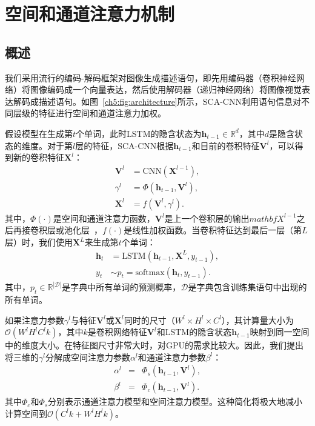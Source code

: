 \section{空间和通道注意力机制}

\subsection{概述}
我们采用流行的编码-解码框架对图像生成描述语句，即先用编码器（卷积神经网络）将图像编码成一个向量表达，然后使用解码器（递归神经网络）将图像视觉表达解码成描述语句。如图~\ref{ch5:fig:architecture}所示，SCA-CNN利用语句信息对不同层级的特征进行空间和通道注意力加权。

假设模型在生成第$t$个单词，此时LSTM的隐含状态为$\mathbf{h}_{t-1}\in\mathbb{R}^d$，其中$d$是隐含状态的维度。对于第$l$层的特征，SCA-CNN根据$\mathbf{h}_{t-1}$和目前的卷积特征$\mathbf{V}^l$，可以得到新的卷积特征$\mathbf{X}^l$：
\begin{equation} \label{ch5:eq:eq_1}
\begin{split}
\mathbf{V}^l &= \textrm{CNN}\left(\mathbf{X}^{l-1}\right),\\
\gamma^l &= \Phi\left(\mathbf{h}_{t-1},\mathbf{V}^l\right),\\
\mathbf{X}^l &= f\left(\mathbf{V}^{l},\gamma^{l}\right).
\end{split}
\end{equation}
其中，$\Phi(\cdot)$是空间和通道注意力函数，$\mathbf{V}^l$是上一个卷积层的输出$mathbf{X}^{l-1}$之后再接卷积层或池化层~\cite{simonyan2015very,he2016deep}，$f(\cdot)$是线性加权函数。当卷积特征达到最后一层（第$L$层）时，我们使用$\mathbf{X}^L$来生成第$t$个单词：
\begin{equation}
\begin{split}
\mathbf{h}_t &= \textrm{LSTM}\left(\mathbf{h}_{t-1},\mathbf{X}^L,y_{t-1}\right),\\
y_t & \sim p_t = \textrm{softmax} \left(\mathbf{h}_t, y_{t-1} \right).
\end{split}
\end{equation}
其中，$p_t \in \mathbb{R}^{|\mathcal{D}|}$是字典中所有单词的预测概率，$\mathcal{D}$是字典包含训练集语句中出现的所有单词。

如果注意力参数$\gamma^l$与特征$\mathbf{V}^l$或$\mathbf{X}^l$同时的尺寸（$W^l\times H^l\times C^l$），其计算量大小为$\mathcal{O}(W^lH^lC^lk)$，其中$k$是卷积网络特征$\mathbf{V}^l$和LSTM的隐含状态$\mathbf{h}_{t-1}$映射到同一空间中的维度大小。在特征图尺寸非常大时，对GPU的需求比较大。因此，我们提出将三维的$\gamma^l$分解成空间注意力参数$\alpha^l$和通道注意力参数$\beta^l$：
\begin{eqnarray}
\alpha^l &= & \Phi_s \left(\mathbf{h}_{t-1},\mathbf{V}^l\right),  \label{ch5:eq:eq_3} \\
\beta^l &= & \Phi_c \left(\mathbf{h}_{t-1},\mathbf{V}^l\right). \label{ch5:eq:eq_4}
\end{eqnarray}
其中$\Phi_c$和$\Phi_s$分别表示通道注意力模型和空间注意力模型。这种简化将极大地减小计算空间到$\mathcal{O}(C^lk+W^lH^lk)$。


